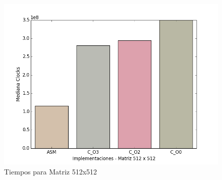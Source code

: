 \begin{figure}[h]
  \centering
    \includegraphics[width=.6\linewidth]{512x512.png}
    \caption{Tiempos para Matriz 512x512}
    \label{fig:M512}
\end{figure}

